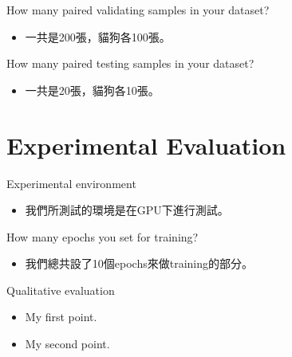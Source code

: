 \documentclass{beamer}
\begin{document}
\begin{frame}{How many paired validating samples in your dataset?}
\begin{CJK*}{UTF8}{bsmi}
  \begin{itemize}
  \item {
     一共是200張，貓狗各100張。
  }
  \end{itemize}
\end{CJK*}
\end{frame}

\begin{frame}{How many paired testing samples in your dataset?}
\begin{CJK*}{UTF8}{bsmi}
  \begin{itemize}
  \item {
    一共是20張，貓狗各10張。
  }
  \end{itemize}
\end{CJK*}
\end{frame}




\section{ Experimental Evaluation }

\begin{frame}{Experimental environment}
\begin{CJK*}{UTF8}{bsmi}
  \begin{itemize}
  \item {
    我們所測試的環境是在GPU下進行測試。
  }
  \end{itemize}
\end{CJK*}
\end{frame}

\begin{frame}{How many epochs you set for training?}
\begin{CJK*}{UTF8}{bsmi}
  \begin{itemize}
  \item {
   我們總共設了10個epochs來做training的部分。
  }
  \end{itemize}
\end{CJK*}
\end{frame}

\begin{frame}{Qualitative evaluation }
  \begin{itemize}
  \item {
    My first point.
  }
  \item {
    My second point.
  }
  \end{itemize}
\end{frame}
\end{document}
